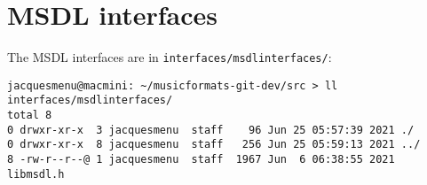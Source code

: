 \section{MSDL interfaces}

The MSDL interfaces are in {\tt interfaces/msdlinterfaces/}:
\begin{lstlisting}[language=Terminal]
jacquesmenu@macmini: ~/musicformats-git-dev/src > ll interfaces/msdlinterfaces/
total 8
0 drwxr-xr-x  3 jacquesmenu  staff    96 Jun 25 05:57:39 2021 ./
0 drwxr-xr-x  8 jacquesmenu  staff   256 Jun 25 05:59:13 2021 ../
8 -rw-r--r--@ 1 jacquesmenu  staff  1967 Jun  6 06:38:55 2021 libmsdl.h
\end{lstlisting}


